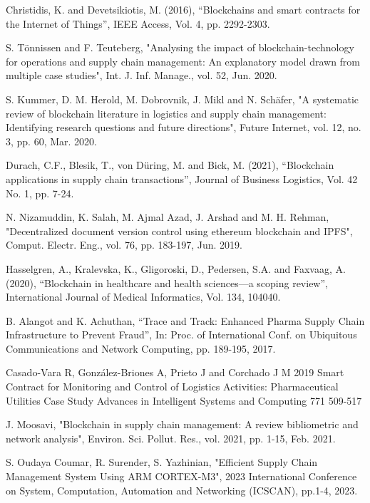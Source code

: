 \documentclass[conference]{IEEEtran}
\begin{document}
\begin{thebibliography}{00}
Christidis, K. and Devetsikiotis, M. (2016), “Blockchains and smart contracts for the Internet of Things”, IEEE Access, Vol. 4, pp. 2292-2303.

S. Tönnissen and F. Teuteberg, "Analysing the impact of blockchain-technology for operations and supply chain management: An explanatory model drawn from multiple case studies", Int. J. Inf. Manage., vol. 52, Jun. 2020.


S. Kummer, D. M. Herold, M. Dobrovnik, J. Mikl and N. Schäfer, "A systematic review of blockchain literature in logistics and supply chain management: Identifying research questions and future directions", Future Internet, vol. 12, no. 3, pp. 60, Mar. 2020.


Durach, C.F., Blesik, T., von Düring, M. and Bick, M. (2021), “Blockchain applications in supply chain transactions”, Journal of Business Logistics, Vol. 42 No. 1, pp. 7-24.

N. Nizamuddin, K. Salah, M. Ajmal Azad, J. Arshad and M. H. Rehman, "Decentralized document version control using ethereum blockchain and IPFS", Comput. Electr. Eng., vol. 76, pp. 183-197, Jun. 2019.


Hasselgren, A., Kralevska, K., Gligoroski, D., Pedersen, S.A. and Faxvaag, A. (2020), “Blockchain in healthcare and health sciences—a scoping review”, International Journal of Medical Informatics, Vol. 134, 104040.


B. Alangot and K. Achuthan, “Trace and Track:
Enhanced Pharma Supply Chain Infrastructure
to Prevent Fraud”, In: Proc. of International
Conf. on Ubiquitous Communications and
Network Computing, pp. 189-195, 2017.



Casado-Vara R, González-Briones A, Prieto J and Corchado J M 2019 Smart Contract for Monitoring and Control of Logistics Activities: Pharmaceutical Utilities Case Study Advances in Intelligent Systems and Computing 771 509-517

J. Moosavi, "Blockchain in supply chain management: A review bibliometric and network analysis", Environ. Sci. Pollut. Res., vol. 2021, pp. 1-15, Feb. 2021.


S. Oudaya Coumar, R. Surender, S. Yazhinian, "Efficient Supply Chain Management System Using ARM CORTEX-M3", 2023 International Conference on System, Computation, Automation and Networking (ICSCAN), pp.1-4, 2023.


\end{thebibliography}
\end{document}
